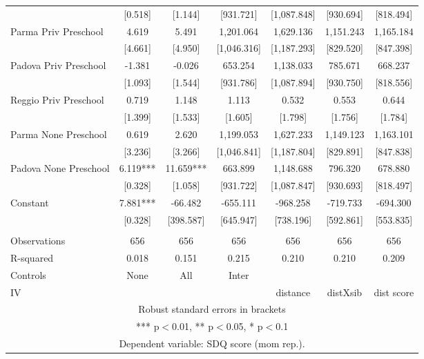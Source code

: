 \begin{tabular}{lcccccc}
 & [0.518] & [1.144] & [931.721] & [1,087.848] & [930.694] & [818.494] \\
Parma Priv Preschool & 4.619 & 5.491 & 1,201.064 & 1,629.136 & 1,151.243 & 1,165.184 \\
 & [4.661] & [4.950] & [1,046.316] & [1,187.293] & [829.520] & [847.398] \\
Padova Priv Preschool & -1.381 & -0.026 & 653.254 & 1,138.033 & 785.671 & 668.237 \\
 & [1.093] & [1.544] & [931.786] & [1,087.894] & [930.750] & [818.556] \\
Reggio Priv Preschool & 0.719 & 1.148 & 1.113 & 0.532 & 0.553 & 0.644 \\
 & [1.399] & [1.533] & [1.605] & [1.798] & [1.756] & [1.784] \\
Parma None Preschool & 0.619 & 2.620 & 1,199.053 & 1,627.233 & 1,149.123 & 1,163.101 \\
 & [3.236] & [3.266] & [1,046.841] & [1,187.804] & [829.891] & [847.838] \\
Padova None Preschool & 6.119*** & 11.659*** & 663.899 & 1,148.688 & 796.320 & 678.880 \\
 & [0.328] & [1.058] & [931.722] & [1,087.847] & [930.693] & [818.497] \\
Constant & 7.881*** & -66.482 & -655.111 & -968.258 & -719.733 & -694.300 \\
 & [0.328] & [398.587] & [645.947] & [738.196] & [592.861] & [553.835] \\
 &  &  &  &  &  &  \\
Observations & 656 & 656 & 656 & 656 & 656 & 656 \\
R-squared & 0.018 & 0.151 & 0.215 & 0.210 & 0.210 & 0.209 \\
Controls & None & All & Inter &  &  &  \\
 IV &  &  &  & distance & distXsib & dist score \\ \hline
\multicolumn{7}{c}{ Robust standard errors in brackets} \\
\multicolumn{7}{c}{ *** p$<$0.01, ** p$<$0.05, * p$<$0.1} \\
\multicolumn{7}{c}{ Dependent variable: SDQ score (mom rep.).} \\
\end{tabular}
